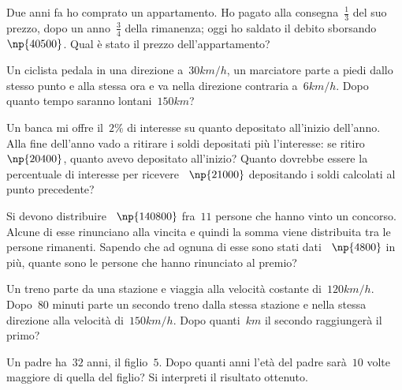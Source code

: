 \begin{multicols}{2}
\begin{esercizio}[\Ast]
\label{ese:16.73}
Due anni fa ho comprato un appartamento. Ho pagato alla consegna~$\frac{1}{3}$ del suo prezzo, dopo un anno~$\frac{3}{4}$ della rimanenza; oggi ho saldato il debito sborsando \officialeuro~$\np{40500}$. Qual è stato il prezzo dell'appartamento?
\end{esercizio}

\begin{esercizio}[\Ast]
\label{ese:16.74}
Un ciclista pedala in una direzione a~$30\unit{km/h}$, un marciatore parte a piedi dallo stesso punto e alla stessa ora e va nella direzione contraria a~$6\unit{km/h}$. Dopo quanto tempo saranno lontani~$150\unit{km}$?
\end{esercizio}

\begin{esercizio}[\Ast]
\label{ese:16.75}
Un banca mi offre il~$2\%$ di interesse su quanto depositato all'inizio dell'anno. Alla fine dell'anno vado a ritirare i soldi depositati più l'interesse: se ritiro \officialeuro~$\np{20400}$, quanto avevo depositato all'inizio? Quanto dovrebbe essere la percentuale di interesse per ricevere \officialeuro~$\np{21000}$ depositando i soldi calcolati al punto precedente?
\end{esercizio}

\begin{esercizio}[\Ast]
\label{ese:16.76}
Si devono distribuire \officialeuro~$\np{140800}$ fra~$11$ persone che hanno vinto un concorso. Alcune di esse rinunciano alla vincita e quindi la somma viene distribuita tra le persone rimanenti. Sapendo che ad ognuna di esse sono stati dati \officialeuro~$\np{4800}$ in più, quante sono le persone che hanno rinunciato al premio?
\end{esercizio}

\begin{esercizio}[\Ast]
\label{ese:16.77}
Un treno parte da una stazione e viaggia alla velocità costante di~$120\unit{km/h}$. Dopo~$80$ minuti parte un secondo treno dalla stessa stazione e nella stessa direzione alla velocità di~$150\unit{km/h}$. Dopo quanti~$\unit{km}$ il secondo raggiungerà il primo?
\end{esercizio}

\begin{esercizio}[\Ast]
\label{ese:16.78}
Un padre ha~$32$ anni, il figlio~$5$. Dopo quanti anni l'età del padre sarà~$10$ volte maggiore di quella del figlio? Si interpreti il risultato ottenuto.
\end{esercizio}


\end{multicols}
